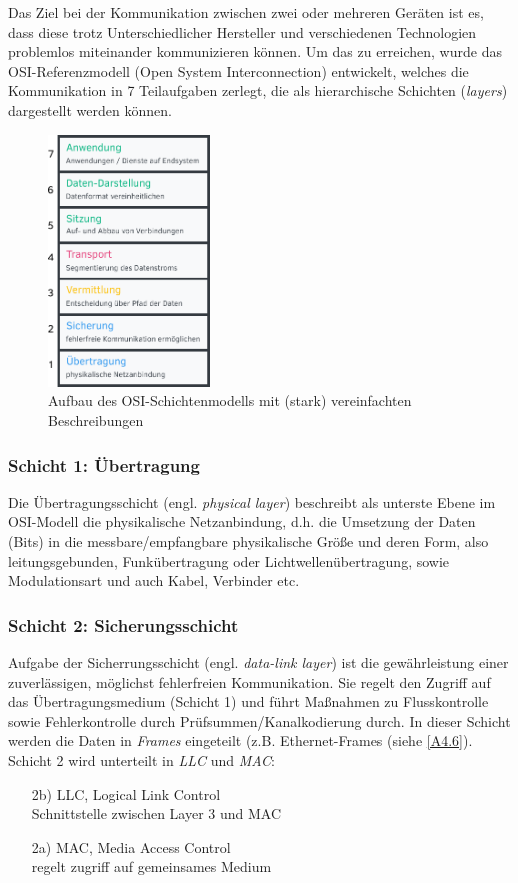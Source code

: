Das Ziel bei der Kommunikation zwischen zwei oder mehreren Geräten ist es, dass diese trotz Unterschiedlicher Hersteller und verschiedenen Technologien problemlos miteinander kommunizieren können. Um das zu erreichen, wurde das OSI-Referenzmodell (Open System Interconnection) entwickelt, welches die Kommunikation in 7 Teilaufgaben zerlegt, die als hierarchische Schichten (\emph{layers}) dargestellt werden können.
\begin{figure}[H]
\centering
\includegraphics[width=0.382\textwidth]{graphics/a2.pdf}
\caption{Aufbau des OSI-Schichtenmodells mit (stark) vereinfachten Beschreibungen}
\end{figure}

\subsubsection{Schicht 1: Übertragung}
Die Übertragungsschicht (engl. \emph{physical layer}) beschreibt als unterste Ebene im OSI-Modell die physikalische Netzanbindung, d.h. die Umsetzung der Daten (Bits) in die messbare/empfangbare physikalische Größe und deren Form, also leitungsgebunden, Funkübertragung oder Lichtwellenübertragung, sowie Modulationsart und auch Kabel, Verbinder etc.

\subsubsection{Schicht 2: Sicherungsschicht}
Aufgabe der Sicherrungsschicht (engl. \emph{data-link layer}) ist die gewährleistung einer zuverlässigen, möglichst fehlerfreien Kommunikation. Sie regelt den Zugriff auf das Übertragungsmedium (Schicht 1) und führt Maßnahmen zu Flusskontrolle sowie Fehlerkontrolle durch Prüfsummen/Kanalkodierung durch. In dieser Schicht werden die Daten in \emph{Frames} eingeteilt (z.B. Ethernet-Frames (siehe \ref{A4.6}).
Schicht 2 wird unterteilt in \emph{LLC} und \emph{MAC}:
\begin{enumerate}
        \item[2b)] LLC, Logical Link Control\\
        \small Schnittstelle zwischen Layer 3 und MAC
        \item[2a)] MAC, Media Access Control\\
        \small regelt zugriff auf gemeinsames Medium
\end{enumerate}

